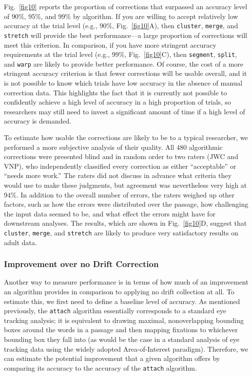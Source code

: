 \documentclass[doc,biblatex]{apa7}
\begin{document}
Fig.~\ref{fig10} reports the proportion of corrections that surpassed an accuracy level of 90\%, 95\%, and 99\% by algorithm. If you are willing to accept relatively low accuracy at the trial level (e.g., 90\%, Fig.~\ref{fig10}A), then \texttt{cluster}, \texttt{merge}, and \texttt{stretch} will provide the best performance---a large proportion of corrections will meet this criterion. In comparison, if you have more stringent accuracy requirements at the trial level (e.g., 99\%, Fig.~\ref{fig10}C), then \texttt{segment}, \texttt{split}, and \texttt{warp} are likely to provide better performance. Of course, the cost of a more stringent accuracy criterion is that fewer corrections will be usable overall, and it is not possible to know which trials have low accuracy in the absence of manual correction data. This highlights the fact that it is currently not possible to confidently achieve a high level of accuracy in a high proportion of trials, so researchers may still need to invest a significant amount of time if a high level of accuracy is demanded.

To estimate how usable the corrections are likely to be to a typical researcher, we performed a more subjective analysis of their quality. All 480 algorithmic corrections were presented blind and in random order to two raters (JWC and VNP), who independently classified every correction as either ``acceptable'' or ``needs more work.'' The raters did not discuss in advance what criteria they would use to make these judgments, but agreement was nevertheless very high at 94\%. In addition to the overall number of errors, the raters weighed up other factors, such as how the errors were distributed over the passage, how challenging the input data seemed to be, and what effect the errors might have for downstream analyses. The results, which are shown in Fig.~\ref{fig10}D, suggest that \texttt{cluster}, \texttt{merge}, and \texttt{stretch} are likely to produce very satisfactory results on adult data.

\subsubsection{Improvement over no Drift Correction}

Another way to measure performance is in terms of how much of an improvement an algorithm provides in comparison to applying no drift collection at all. To estimate this, we first need to define a baseline level of accuracy. As mentioned previously, the \texttt{attach} algorithm essentially corresponds to a standard eye tracking analysis; it is equivalent to drawing maximal, nonoverlapping bounding boxes around the words in a passage and then mapping fixations to whichever bounding box they fall into (as would be the case in a standard analysis of eye tracking data using the widely adopted Area-of-Interest paradigm). Therefore, we can estimate the potential improvement that a given algorithm offers by comparing its accuracy to the accuracy of the \texttt{attach} algorithm.
\end{document}
